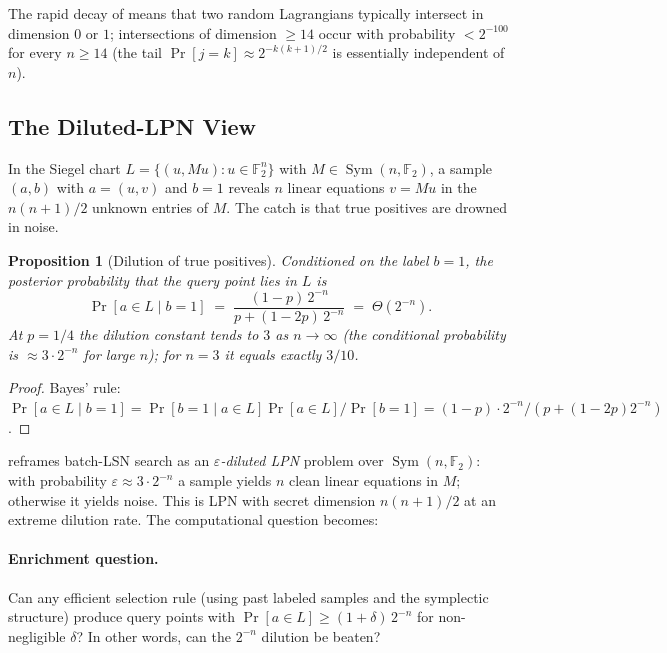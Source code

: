 \documentclass[11pt,a4paper]{article}
\theoremstyle{plain}
\newtheorem{proposition}[theorem]{Proposition}
\theoremstyle{definition}
\newcommand{\F}{\mathbb{F}}
\begin{document}
The rapid decay of  means that two random Lagrangians typically intersect in dimension $0$ or $1$; intersections of dimension $\geq 14$ occur with probability $< 2^{-100}$ for every $n \geq 14$ (the tail $\Pr[j=k] \approx 2^{-k(k+1)/2}$ is essentially independent of $n$).

\subsection{The Diluted-LPN View}
\label{subsec:diluted-lpn}

In the Siegel chart $L = \{(u, Mu) : u \in \F_2^n\}$ with $M \in \operatorname{Sym}(n,\F_2)$, a sample $(a,b)$ with $a=(u,v)$ and $b=1$ reveals $n$ linear equations $v = Mu$ in the $n(n+1)/2$ unknown entries of $M$.  The catch is that true positives are drowned in noise.

\begin{proposition}[Dilution of true positives]
\label{prop:dilution}
Conditioned on the label $b=1$, the posterior probability that the query point lies in $L$ is
\[
\Pr[a \in L \mid b=1] \;=\; \frac{(1-p)\,2^{-n}}{p + (1-2p)\,2^{-n}} \;=\; \Theta(2^{-n}).
\]
At $p=1/4$ the dilution constant tends to $3$ as $n\to\infty$ (the conditional probability is $\approx 3\cdot 2^{-n}$ for large $n$); for $n=3$ it equals exactly $3/10$.
\end{proposition}

\begin{proof}
Bayes' rule: $\Pr[a \in L \mid b=1] = \Pr[b=1 \mid a \in L]\Pr[a \in L] / \Pr[b=1] = (1-p)\cdot 2^{-n} / (p + (1-2p)2^{-n})$.
\end{proof}

 reframes batch-LSN search as an \emph{$\varepsilon$-diluted LPN} problem over $\operatorname{Sym}(n,\F_2)$: with probability $\varepsilon \approx 3\cdot 2^{-n}$ a sample yields $n$ clean linear equations in $M$; otherwise it yields noise.  This is LPN with secret dimension $n(n+1)/2$ at an extreme dilution rate.  The computational question becomes:

\paragraph{Enrichment question.}
\label{q:enrichment}
Can any efficient selection rule (using past labeled samples and the symplectic structure) produce query points with $\Pr[a \in L] \geq (1+\delta)\,2^{-n}$ for non-negligible $\delta$?  In other words, can the $2^{-n}$ dilution be beaten?
\end{document}
